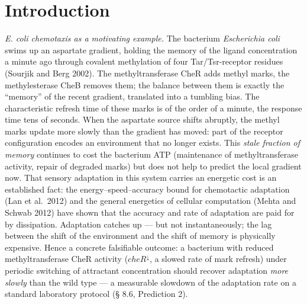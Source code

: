 \documentclass[pdflatex,sn-mathphys-ay]{sn-jnl}
\begin{document}
\section{Introduction}\label{introduction}



\emph{E. coli chemotaxis as a motivating example.} The bacterium \emph{Escherichia coli} swims up an aspartate gradient, holding the memory of the ligand concentration a minute ago through covalent methylation of four Tar/Tsr-receptor residues (Sourjik and Berg 2002). The methyltransferase CheR adds methyl marks, the methylesterase CheB removes them; the balance between them is exactly the ``memory'' of the recent gradient, translated into a tumbling bias. The characteristic refresh time of these marks is of the order of a minute, the response time tens of seconds. When the aspartate source shifts abruptly, the methyl marks update more slowly than the gradient has moved: part of the receptor configuration encodes an environment that no longer exists. This \emph{stale fraction of memory} continues to cost the bacterium ATP (maintenance of methyltransferase activity, repair of degraded marks) but does not help to predict the local gradient now. That sensory adaptation in this system carries an energetic cost is an established fact: the energy--speed--accuracy bound for chemotactic adaptation (Lan et al.~2012) and the general energetics of cellular computation (Mehta and Schwab 2012) have shown that the accuracy and rate of adaptation are paid for by dissipation. Adaptation catches up --- but not instantaneously; the lag between the shift of the environment and the shift of memory is physically expensive. Hence a concrete falsifiable outcome: a bacterium with reduced methyltransferase CheR activity (\(cheR^{\downarrow}\), a slowed rate of mark refresh) under periodic switching of attractant concentration should recover adaptation \emph{more slowly} than the wild type --- a measurable slowdown of the adaptation rate on a standard laboratory protocol (§ 8.6, Prediction 2).
\end{document}
